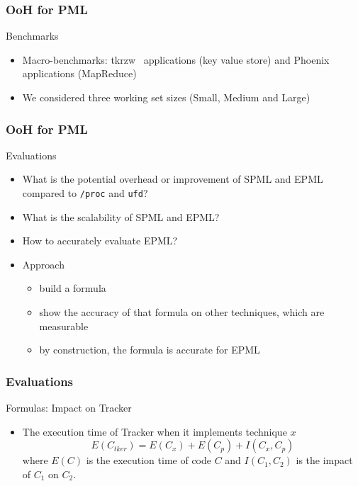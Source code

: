 \documentclass[xcolor=table,bigger,unknownkeysallowed]{beamer}
\begin{document}
        \begin{frame}
                \frametitle{OoH for PML}			
			\begin{block}{Benchmarks}
				\begin{itemize}
					\item Macro-benchmarks: tkrzw~\cite{tkrzw} applications (key value store) and Phoenix applications (MapReduce)
					\item We considered three working set sizes (Small, Medium and Large)
				\end{itemize}
			\end{block} 			
        \end{frame}  
        \begin{frame}
            \frametitle{OoH for PML}			
			\begin{block}{Evaluations}
				\begin{itemize}
					\item What is the potential overhead or improvement of SPML and EPML compared to \texttt{/proc} and \texttt{ufd}?
					\item What is the scalability of SPML and EPML?
					\item How to accurately evaluate EPML?
					\item Approach
					\begin{itemize}
						\item build a formula
						\item show the accuracy of that formula on other techniques, which are measurable
						\item by construction, the formula is accurate for EPML
					\end{itemize}
				\end{itemize}
			\end{block} 
        \end{frame} 
        \begin{frame}
                \frametitle{Evaluations}			
			\begin{block}{Formulas: Impact on Tracker}
				\begin{itemize}
					\item The execution time of Tracker when it implements technique $x$
					\begin{equation}
						E(C_{tker}) = E(C_{x}) + E(C_{p}) + I(C_{x},C_{p})
						\label{eq:formula-generic}
					\end{equation}
					where $E(C)$ is the execution time of code $C$ and $I(C_1,C_2)$ is the impact of $C_1$ on $C_2$.
				\end{itemize}
			\end{block} 
        \end{frame}                                                                              
\end{document}
